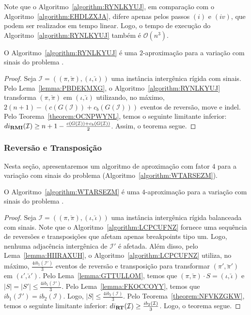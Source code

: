 Note que o Algoritmo~\ref{algorithm:RYNLKYUJ}, em comparação com o Algoritmo~\ref{algorithm:EHDLZXJA}, difere apenas pelos passos $(i)$ e $(iv)$, que podem ser realizados em tempo linear. Logo, o tempo de execução do Algoritmo~\ref{algorithm:RYNLKYUJ} também é $\mathcal{O}(n^3)$.

\begin{theorem}\label{theorem:ICVGEGVZ}
O Algoritmo~\ref{algorithm:RYNLKYUJ} é uma $2$-aproximação para a variação com sinais do problema \SbIRMI{}.
\end{theorem}
\begin{proof}
Seja $\mathcal{I} = ((\pi,\breve\pi),(\iota,\breve\iota))$ uma instância intergênica rígida com sinais. Pelo Lema~\ref{lemma:PBDEKMXG}, o Algoritmo~\ref{algorithm:RYNLKYUJ} transforma $(\pi,\breve\pi)$ em $(\iota,\breve\iota)$ utilizando, no máximo, $2(n + 1) - (c(G(\mathcal{I})) + c_b(G(\mathcal{I})))$ eventos de reversão, move e indel. Pelo Teorema~\ref{theorem:OCNPWYNL}, temos o seguinte limitante inferior: $di_{\textbf{RMI}}(\mathcal{I}) \ge {n + 1} - \frac{c(G(\mathcal{I})) + c_b(G(\mathcal{I}))}{2}$. Assim, o teorema segue.
\end{proof}

\subsubsection{Reversão e Transposição}

Nesta seção, apresentaremos um algoritmo de aproximação com fator $4$ para a variação com sinais do problema \SbIRT{} (Algoritmo~\ref{algorithm:WTARSEZM}).



\begin{theorem}\label{theorem:TRRZCTJT}
O Algoritmo~\ref{algorithm:WTARSEZM} é uma $4$-aproximação para a variação com sinais do problema \SbIRT{}.
\end{theorem}
\begin{proof}
Seja $\mathcal{I} = ((\pi,\breve\pi),(\iota,\breve\iota))$ uma instância intergênica rígida balanceada com sinais. Note que o Algoritmo~\ref{algorithm:LCPCUFNZ} fornece uma sequência de reversões e transposições que afetam apenas breakpoints tipo um. Logo, nenhuma adjacência intergênica de $\mathcal{I'}$ é afetada. Além disso, pelo Lema~\ref{lemma:HIIRAXUH}, o Algoritmo~\ref{algorithm:LCPCUFNZ} utiliza, no máximo, $\frac{4ib_1(\mathcal{I'})}{3}$ eventos de reversão e transposição para transformar $(\pi',\breve\pi')$ em $(\iota',\breve\iota')$. Pelo Lema~\ref{lemma:GTTULLOM}, temos que $(\pi,\breve\pi) \cdot S = (\iota,\breve\iota)$ e $|S| = |S'| \le \frac{4ib_1(\mathcal{I'})}{3}$. Pelo Lema~\ref{lemma:FKOCCOYY}, temos que $ib_1(\mathcal{I'}) = ib_2(\mathcal{I})$. Logo, $|S| \le \frac{4ib_2(\mathcal{I})}{3}$. Pelo Teorema~\ref{theorem:NFVKZGKW}, temos o seguinte limitante inferior: $di_{\textbf{RT}}(\mathcal{I}) \ge \frac{ib_2(\mathcal{I})}{3}$. Logo, o teorema segue.
\end{proof}

